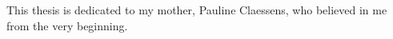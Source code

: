 This thesis is dedicated to my mother, Pauline Claessens, who believed in me from the very beginning.